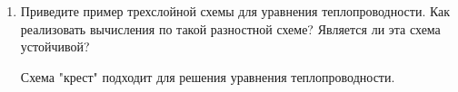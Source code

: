 \documentclass[12pt, a4paper]{article}
\begin{document}
\begin{enumerate}
\item Приведите пример трехслойной схемы для уравнения теплопроводности. Как реализовать вычисления по такой разностной схеме? Является ли эта схема устойчивой?

Схема "крест" подходит для решения уравнения теплопроводности.


\end{enumerate}


\newpage
\end{document}
